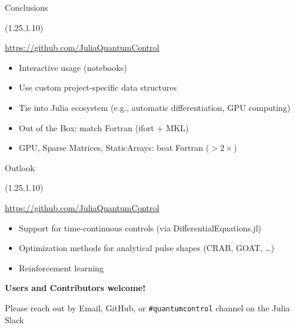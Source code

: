 \documentclass[compress, aspectratio=169]{beamer}
\begin{document}
\begin{frame}{Conclusions}
  \begin{textblock}{14.5}(1.25,1.10)
    \begin{center}
      \url{https://github.com/JuliaQuantumControl}
    \end{center}
    \vspace{8pt}
    \begin{itemize}
      \item Interactive usage (notebooks)
      \item Use custom project-specific data structures
      \item Tie into Julia ecosystem (e.g., automatic differentiation, GPU computing)
    \end{itemize}
    \par
    \vspace{10pt}
    \begin{itemize}
      \item Out of the Box: match Fortran (ifort + MKL)
      \item GPU, Sparse Matrices, StaticArrays: beat Fortran ($> 2\times$)
    \end{itemize}
  \end{textblock}
\end{frame}

\begin{frame}{Outlook}
  \begin{textblock}{14.5}(1.25,1.10)
    \begin{center}
      \url{https://github.com/JuliaQuantumControl}
    \end{center}
    \vspace{8pt}
    \begin{itemize}
      \item Support for time-continuous controls (via DifferentialEquations.jl)
    \end{itemize}
    \vspace{10pt}
    \begin{itemize}
      \item Optimization methods for analytical pulse shapes (CRAB, GOAT, \dots)
      \item Reinforcement learning
    \end{itemize}
    \vspace{24pt}
    \begin{center}
      {\bf \color{Red}
        Users and Contributors welcome!
      }
    \end{center}
    \vspace{5pt}
    {\footnotesize
      Please reach out by Email, GitHub, or \texttt{\#quantumcontrol} channel on the Julia Slack
    }
  \end{textblock}
\end{frame}
\end{document}
